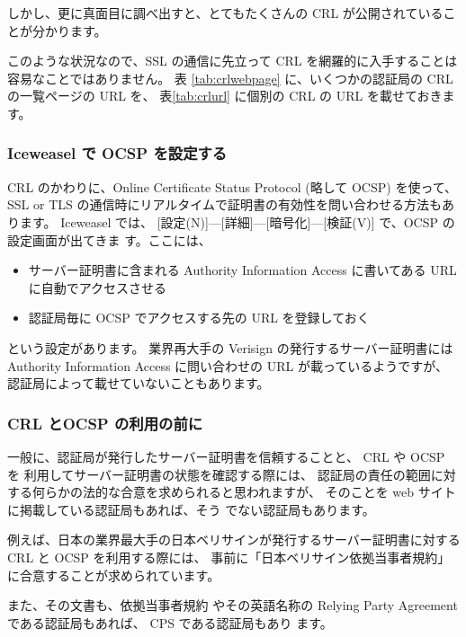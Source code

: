 \documentclass[mingoth,a4paper]{jsarticle}
\begin{document}
しかし、更に真面目に調べ出すと、とてもたくさんの CRL が公開されているこ
とが分かります。

このような状況なので、SSL の通信に先立って CRL を網羅的に入手することは
容易なことではありません。
表 \ref{tab:crlwebpage} に、いくつかの認証局の CRL の一覧ページの URL を、
表\ref{tab:crlurl} に個別の CRL の URL を載せておきます。

\subsubsection{Iceweasel で OCSP を設定する}

CRL のかわりに、Online Certificate Status Protocol\cite{RFC2580} (略して OCSP) を使って、
SSL or TLS の通信時にリアルタイムで証明書の有効性を問い合わせる方法もあります。
Iceweasel では、
[設定(N)]---[詳細]---[暗号化]---[検証(V)] で、OCSP の設定画面が出てきま
す。ここには、
\begin{itemize}
\item サーバー証明書に含まれる Authority Information Access に書いてある
      URL に自動でアクセスさせる
\item 認証局毎に OCSP でアクセスする先の URL を登録しておく
\end{itemize}
という設定があります。
業界再大手の Verisign の発行するサーバー証明書には Authority Information
Access に問い合わせの URL が載っているようですが、
認証局によって載せていないこともあります。

\subsubsection{CRL とOCSP の利用の前に}\label{sec:rpa}

一般に、認証局が発行したサーバー証明書を信頼することと、 CRL や OCSP を
利用してサーバー証明書の状態を確認する際には、
認証局の責任の範囲に対する何らかの法的な合意を求められると思われますが、
そのことを web サイトに掲載している認証局\cite{entrust-la}もあれば、そう
でない認証局もあります。

例えば、日本の業界最大手の日本ベリサインが発行するサーバー証明書に対する
CRL と OCSP を利用する際には、
事前に「日本ベリサイン依拠当事者規約\cite{verisignkk-rpa}」 に合意することが求められています。

また、その文書も、依拠当事者規約
\cite{globalsign-rpa} やその英語名称の Relying Party
Agreement\cite{verisign-rpa}\cite{comodo-rpa}である認証局もあれば、
CPS\cite{entrust-la}\cite{cybertrust-cps} である認証局もあり
ます。
\end{document}
